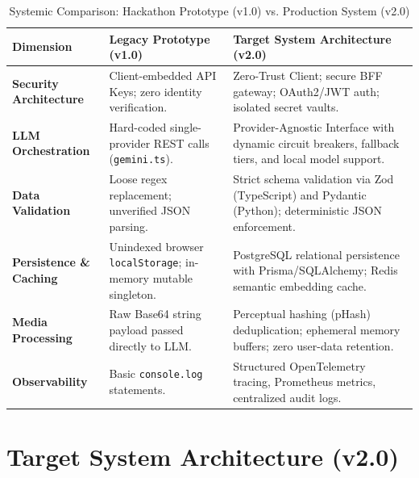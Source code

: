 \documentclass[11pt,a4paper]{report}
\begin{document}
\begin{table}[htbp]
\centering
\caption{Systemic Comparison: Hackathon Prototype (v1.0) vs. Production System (v2.0)}
\label{tab:v1_vs_v2}
\small
\begin{tabularx}{\textwidth}{p{3.2cm} X X}
\toprule
\textbf{Dimension} & \textbf{Legacy Prototype (v1.0)} & \textbf{Target System Architecture (v2.0)} \\
\midrule
\textbf{Security Architecture} & Client-embedded API Keys; zero identity verification. & Zero-Trust Client; secure BFF gateway; OAuth2/JWT auth; isolated secret vaults. \\
\addlinespace
\textbf{LLM Orchestration} & Hard-coded single-provider REST calls (\texttt{gemini.ts}). & Provider-Agnostic Interface with dynamic circuit breakers, fallback tiers, and local model support. \\
\addlinespace
\textbf{Data Validation} & Loose regex replacement; unverified JSON parsing. & Strict schema validation via Zod (TypeScript) and Pydantic (Python); deterministic JSON enforcement. \\
\addlinespace
\textbf{Persistence \& Caching} & Unindexed browser \texttt{localStorage}; in-memory mutable singleton. & PostgreSQL relational persistence with Prisma/SQLAlchemy; Redis semantic embedding cache. \\
\addlinespace
\textbf{Media Processing} & Raw Base64 string payload passed directly to LLM. & Perceptual hashing (pHash) deduplication; ephemeral memory buffers; zero user-data retention. \\
\addlinespace
\textbf{Observability} & Basic \texttt{console.log} statements. & Structured OpenTelemetry tracing, Prometheus metrics, centralized audit logs. \\
\bottomrule
\end{tabularx}
\end{table}

\chapter{Target System Architecture (v2.0)}
\end{document}
